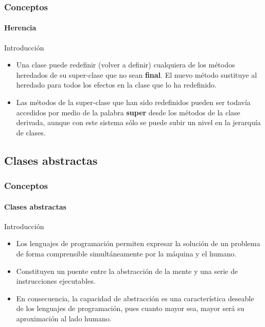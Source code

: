 \documentclass{beamer}
\begin{document}
		\begin{frame}
			\frametitle{Conceptos}
			\framesubtitle{Herencia}

			\begin{block}{Introducci\'on}
				\begin{itemize}
  					\item Una clase puede redefinir (volver a definir) cualquiera de los m\'etodos heredados de su super-clase que no sean \textbf{final}. El nuevo m\'etodo sustituye al heredado para todos los efectos en la clase que lo ha redefinido.
					\item Las m\'etodos de la super-clase que han sido redefinidos pueden ser todav\'ia accedidos por medio de la palabra \textbf{super} desde los m\'etodos de la clase derivada, aunque con este sistema s\'olo se puede subir un nivel en la jerarqu\'ia de clases.
				\end{itemize}
			\end{block}
		\end{frame}

		\subsection{Clases abstractas}

		\begin{frame}
			\frametitle{Conceptos}
			\framesubtitle{Clases abstractas}

			\begin{block}{Introducci\'on}
				\begin{itemize}
  					\item Los lenguajes de programaci\'on permiten expresar la soluci\'on de un problema de forma comprensible simult\'aneamente por la m\'aquina y el humano. 
					\item Constituyen un puente entre la abstracci\'on de la mente y una serie de instrucciones ejecutables.
					\item En consecuencia, la capacidad de abstracci\'on es una caracter\'istica deseable de los lenguajes de programaci\'on, pues cuanto mayor sea, mayor ser\'a su aproximaci\'on al lado humano.
				\end{itemize}
			\end{block}
		\end{frame}
\end{document}

